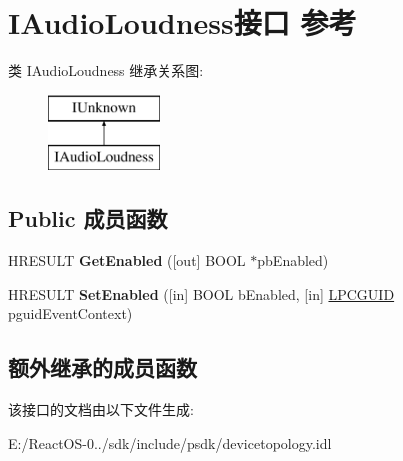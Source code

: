 \hypertarget{interface_i_audio_loudness}{}\section{I\+Audio\+Loudness接口 参考}
\label{interface_i_audio_loudness}
类 I\+Audio\+Loudness 继承关系图\+:\begin{figure}[H]
\begin{center}
\leavevmode
\includegraphics[height=2.000000cm]{interface_i_audio_loudness}
\end{center}
\end{figure}
\subsection*{Public 成员函数}
\begin{DoxyCompactItemize}
\item 
\mbox{\label{interface_i_audio_loudness_a41a781a8c342a533a11bfa5e75ecd7a4}} 
H\+R\+E\+S\+U\+LT {\bfseries Get\+Enabled} (\mbox{[}out\mbox{]} B\+O\+OL $\ast$pb\+Enabled)
\item 
\mbox{\label{interface_i_audio_loudness_aec5bdd86f78a87302d307a2293868706}} 
H\+R\+E\+S\+U\+LT {\bfseries Set\+Enabled} (\mbox{[}in\mbox{]} B\+O\+OL b\+Enabled, \mbox{[}in\mbox{]} \hyperlink{interface_g_u_i_d}{L\+P\+C\+G\+U\+ID} pguid\+Event\+Context)
\end{DoxyCompactItemize}
\subsection*{额外继承的成员函数}


该接口的文档由以下文件生成\+:\begin{DoxyCompactItemize}
\item 
E\+:/\+React\+O\+S-\/0../sdk/include/psdk/devicetopology.\+idl\end{DoxyCompactItemize}
